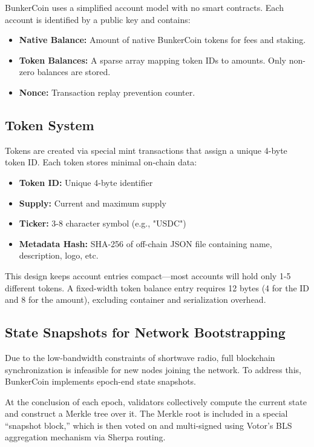 \documentclass{article}
\begin{document}
BunkerCoin uses a simplified account model with no smart contracts. Each account is identified by a public key and contains:

\begin{itemize}
    \item \textbf{Native Balance:} Amount of native BunkerCoin tokens for fees and staking.
    \item \textbf{Token Balances:} A sparse array mapping token IDs to amounts. Only non-zero balances are stored.
    \item \textbf{Nonce:} Transaction replay prevention counter.
\end{itemize}

\subsection{Token System}
\label{sec:tokens}

Tokens are created via special mint transactions that assign a unique 4-byte token ID. Each token stores minimal on-chain data:

\begin{itemize}
    \item \textbf{Token ID:} Unique 4-byte identifier
    \item \textbf{Supply:} Current and maximum supply
    \item \textbf{Ticker:} 3-8 character symbol (e.g., "USDC")
    \item \textbf{Metadata Hash:} SHA-256 of off-chain JSON file containing name, description, logo, etc.
\end{itemize}

This design keeps account entries compact—most accounts will hold only 1-5 different tokens. A fixed-width token balance entry requires 12 bytes (4 for the ID and 8 for the amount), excluding container and serialization overhead.

\subsection{State Snapshots for Network Bootstrapping}

Due to the low-bandwidth constraints of shortwave radio, full blockchain synchronization is infeasible for new nodes joining the network. To address this, BunkerCoin implements epoch-end state snapshots.

At the conclusion of each epoch, validators collectively compute the current state and construct a Merkle tree over it. The Merkle root is included in a special ``snapshot block,'' which is then voted on and multi-signed using Votor's BLS aggregation mechanism via Sherpa routing.
\end{document}
